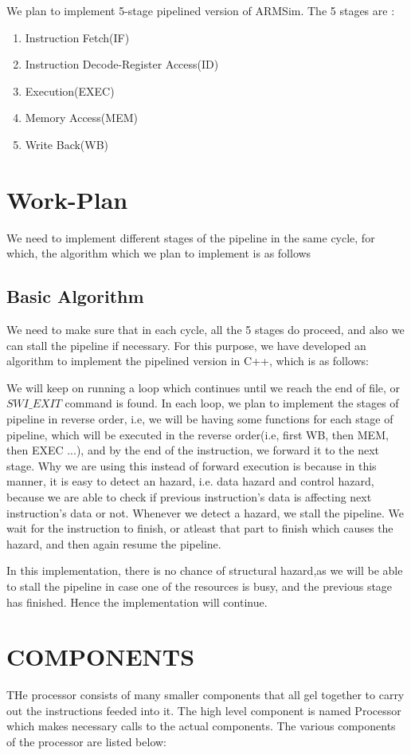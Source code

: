 \documentclass{scrreprt}
\begin{document}
	We plan to implement 5-stage pipelined version of ARMSim. The 5 stages are :
	
\begin{enumerate}
\item Instruction Fetch(IF)
\item Instruction Decode-Register Access(ID)
\item Execution(EXEC)
\item Memory Access(MEM)
\item Write Back(WB)
\end{enumerate}

\chapter{Work-Plan}
We need to implement different stages of the pipeline in the same cycle, for which, the algorithm which we plan to implement is as follows
\section{Basic Algorithm}
We need to make sure that in each cycle, all the 5 stages do proceed, and also we can stall the pipeline if necessary. For this purpose, we have developed an algorithm to implement the pipelined version in C++, which is as follows:

	We will keep on running a loop which continues until we reach the end of file, or $SWI\_EXIT$ command is found. In each loop, we plan to implement the stages of pipeline in reverse order, i.e, we will be having some functions for each stage of pipeline, which will be executed in the reverse order(i.e, first WB, then MEM, then EXEC ...), and by the end of the instruction, we forward it to the next stage. Why we are using this instead of forward execution is because in this manner, it is easy to detect an hazard, i.e. data hazard and control hazard, because we are able to check if previous instruction's data is affecting next instruction's data or not. Whenever we detect a hazard, we stall the pipeline. We wait for the instruction to finish, or atleast that part to finish which causes the hazard, and then again resume the pipeline.
	
	 In this implementation, there is no chance of structural hazard,as we will be able to stall the pipeline in case one of the resources is busy, and the previous stage has finished. Hence the implementation will continue.

\chapter{COMPONENTS}
THe processor consists of many smaller components that all gel together to carry out the instructions feeded into it. The high level component is named Processor which makes necessary calls to the actual components. The various components of the processor are listed below:
\end{document}
